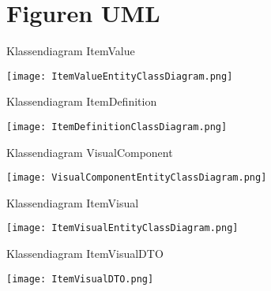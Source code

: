 \chapter{Figuren UML}
\label{appendix:FiguresUML}

\begin{graphic}
    \captionsetup{type=figure}
    \caption{Klassendiagram ItemValue}
    \texttt{[image: ItemValueEntityClassDiagram.png]}
    \label{appendix:ItemValueEntityClassDiagram}
\end{graphic}

\begin{graphic}
    \captionsetup{type=figure}
    \caption{Klassendiagram  ItemDefinition}
    \texttt{[image: ItemDefinitionClassDiagram.png]}
    \label{appendix:ItemDefinitionClassDiagram}
\end{graphic}

\whitespace[2]
\begin{graphic}
    \captionsetup{type=figure}
    \caption{Klassendiagram VisualComponent}
    \texttt{[image: VisualComponentEntityClassDiagram.png]}
    \label{appendix:VisualComponentEntityClassDiagram}
\end{graphic}

\whitespace[2]
\begin{graphic}
	\captionsetup{type=figure}
	\caption{Klassendiagram ItemVisual}
	\texttt{[image: ItemVisualEntityClassDiagram.png]}
	\label{appendix:ItemVisualEntityClassDiagram}
\end{graphic}

\whitespace[2]
\begin{graphic}
	\captionsetup{type=figure}
	\caption{Klassendiagram ItemVisualDTO}
	\texttt{[image: ItemVisualDTO.png]}
	\label{appendix:ItemVisualDTOClassDiagram}
\end{graphic}
